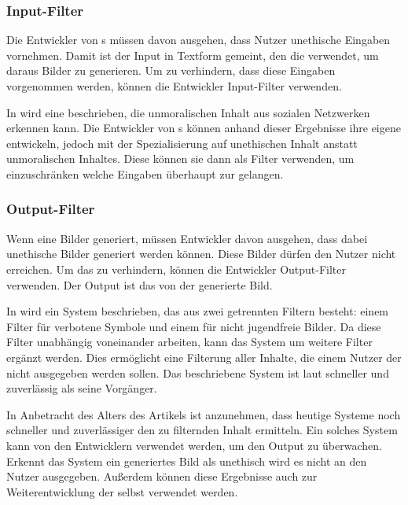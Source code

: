 \documentclass[hidelinks,12pt]{report}
\begin{document}
\subsubsection{Input-Filter}
Die Entwickler von s müssen davon ausgehen, dass Nutzer unethische Eingaben vornehmen. Damit ist der Input in Textform gemeint, den die  verwendet, um daraus Bilder zu generieren. Um zu verhindern, dass diese Eingaben vorgenommen werden, können die Entwickler Input-Filter verwenden. 

In \cite[Artificial Intelligence as a Service for Immoral ContentDetection and Eradication]{Shah} wird eine  beschrieben, die unmoralischen Inhalt aus sozialen Netzwerken erkennen kann. Die Entwickler von s können anhand dieser Ergebnisse ihre eigene  entwickeln, jedoch mit der Spezialisierung auf unethischen Inhalt anstatt unmoralischen Inhaltes. Diese  können sie dann als Filter verwenden, um einzuschränken welche Eingaben überhaupt zur  gelangen.

\subsubsection{Output-Filter}
Wenn eine  Bilder generiert, müssen Entwickler davon ausgehen, dass dabei unethische Bilder generiert werden können. Diese Bilder dürfen den Nutzer nicht erreichen. Um das zu verhindern, können die Entwickler Output-Filter verwenden. Der Output ist das von der  generierte Bild. 

In \cite{Zheng} wird ein System beschrieben, das aus zwei getrennten Filtern besteht: einem Filter für verbotene Symbole und einem für nicht jugendfreie Bilder. Da diese Filter unabhängig voneinander arbeiten, kann das System um weitere Filter ergänzt werden. Dies ermöglicht eine Filterung aller Inhalte, die einem Nutzer der  nicht ausgegeben werden sollen. Das beschriebene System ist laut \cite{Zheng} schneller und zuverlässig als seine Vorgänger. 

In Anbetracht des Alters des Artikels ist anzunehmen, dass heutige Systeme noch schneller und zuverlässiger den zu filternden Inhalt ermitteln. Ein solches System kann von den Entwicklern verwendet werden, um den Output zu überwachen. Erkennt das System ein generiertes Bild als unethisch wird es nicht an den Nutzer ausgegeben. Außerdem können diese Ergebnisse auch zur Weiterentwicklung der  selbst verwendet werden.
\end{document}
